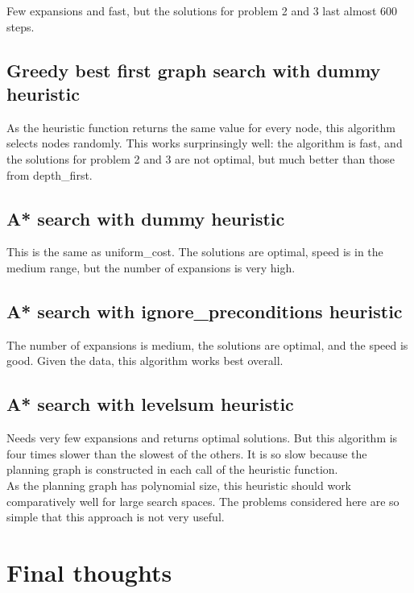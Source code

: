 \documentclass[11pt]{scrartcl}
\begin{document}
Few expansions and fast, but the solutions for problem 2 and 3 last
almost 600 steps.

\subsection*{Greedy best first graph search with dummy
heuristic}\label{greedy-best-first-graph-search-with-dummy-heuristic}

As the heuristic function returns the same value for every node, this
algorithm selects nodes randomly. This works surprinsingly well: the
algorithm is fast, and the solutions for problem 2 and 3 are not
optimal, but much better than those from depth\_first.

\subsection*{A* search with dummy
heuristic}\label{a-search-with-dummy-heuristic}

This is the same as uniform\_cost. The solutions are optimal, speed is
in the medium range, but the number of expansions is very high.

\subsection*{A* search with ignore\_preconditions
heuristic}\label{a-search-with-ignore_preconditions-heuristic}

The number of expansions is medium, the solutions are optimal, and the
speed is good. Given the data, this algorithm works best overall.

\subsection*{A* search with levelsum
heuristic}\label{a-search-with-levelsum-heuristic}

Needs very few expansions and returns optimal solutions. But this
algorithm is four times slower than the slowest of the others. It is so
slow because the planning graph is constructed in each call of the
heuristic function.\\

As the planning graph has polynomial size, this heuristic should work comparatively well
for large search spaces. The problems considered here are so simple that
this approach is not very useful.

\section*{Final thoughts}\label{final-thoughts}
\end{document}
